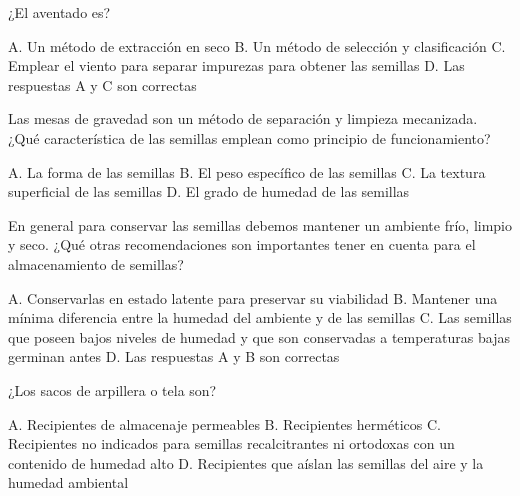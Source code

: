 \documentclass[11pt,answers]{exam}
\begin{document}
{\begin{questions}
\begin{checkboxes}
  \end{checkboxes}
\question ¿El aventado es?
  \begin{checkboxes}
    \choice A. Un método de extracción en seco
    \choice B. Un método de selección y clasificación
    \choice C. Emplear el viento para separar impurezas para obtener las semillas
    \CorrectChoice D. Las respuestas A y C son correctas
  \end{checkboxes}
\question Las mesas de gravedad son un método de separación y limpieza mecanizada. ¿Qué
  característica de las semillas emplean como principio de funcionamiento?
  \begin{checkboxes}
    \choice A. La forma de las semillas
    \CorrectChoice B. El peso específico de las semillas
    \choice C. La textura superficial de las semillas
    \choice D. El grado de humedad de las semillas
  \end{checkboxes}
\question En general para conservar las semillas debemos mantener un ambiente frío, limpio
  y seco. ¿Qué otras recomendaciones son importantes tener en cuenta para el
  almacenamiento de semillas?
  \begin{checkboxes}
    \choice A. Conservarlas en estado latente para preservar su viabilidad
    \choice B. Mantener una mínima diferencia entre la humedad del ambiente y de las
    semillas
    \choice C. Las semillas que poseen bajos niveles de humedad y que son conservadas a
    temperaturas bajas germinan antes
    \CorrectChoice D. Las respuestas A y B son correctas
  \end{checkboxes}
\question ¿Los sacos de arpillera o tela son?
  \begin{checkboxes}
    \CorrectChoice A. Recipientes de almacenaje permeables
    \choice B. Recipientes herméticos
    \choice C. Recipientes no indicados para semillas recalcitrantes ni ortodoxas con un
    contenido de humedad alto
    \choice D. Recipientes que aíslan las semillas del aire y la humedad ambiental
  \end{checkboxes}
\end{questions}
}
\end{document}
